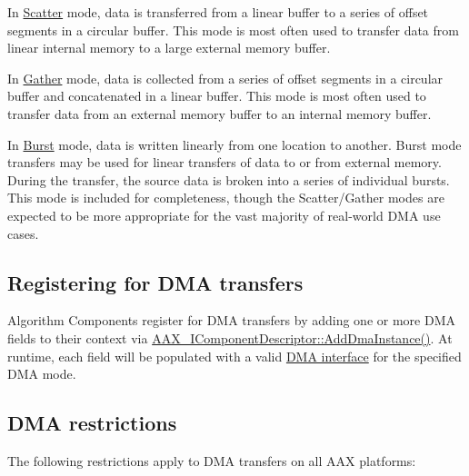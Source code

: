 \begin{DoxyItemize}
\item In \hyperlink{a00095_af8d0f19f2896dd6dbd126b919b24e39bac8f3cbed92bc7d135e306cc154ac2ae6}{Scatter} mode, data is transferred from a linear buffer to a series of offset segments in a circular buffer. This mode is most often used to transfer data from linear internal memory to a large external memory buffer.\end{DoxyItemize}
\begin{DoxyItemize}
\item In \hyperlink{a00095_af8d0f19f2896dd6dbd126b919b24e39badec2b76540ba9a168b7a049acb50654d}{Gather} mode, data is collected from a series of offset segments in a circular buffer and concatenated in a linear buffer. This mode is most often used to transfer data from an external memory buffer to an internal memory buffer.\end{DoxyItemize}
\begin{DoxyItemize}
\item In \hyperlink{a00095_af8d0f19f2896dd6dbd126b919b24e39ba253c129077dc004dd83cca8931e69eb9}{Burst} mode, data is written linearly from one location to another. Burst mode transfers may be used for linear transfers of data to or from external memory. During the transfer, the source data is broken into a series of individual bursts. This mode is included for completeness, though the Scatter/\+Gather modes are expected to be more appropriate for the vast majority of real-\/world D\+M\+A use cases.\end{DoxyItemize}
\hypertarget{a00340_alg_dma_registration}{}\subsection{Registering for D\+M\+A transfers}\label{a00340_alg_dma_registration}
Algorithm Components register for D\+M\+A transfers by adding one or more D\+M\+A fields to their context via \hyperlink{a00088_aff9e1c726bbdf500f2d61b164589744e}{A\+A\+X\+\_\+\+I\+Component\+Descriptor\+::\+Add\+Dma\+Instance()}. At runtime, each field will be populated with a valid \hyperlink{a00095}{D\+M\+A interface} for the specified D\+M\+A mode.\hypertarget{a00340_alg_dma_restrictions}{}\subsection{D\+M\+A restrictions}\label{a00340_alg_dma_restrictions}
The following restrictions apply to D\+M\+A transfers on all A\+A\+X platforms\+:

